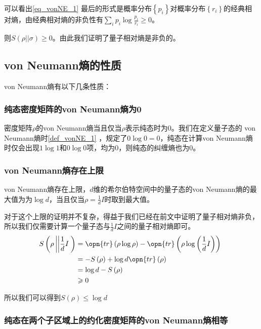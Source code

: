 可以看出\autoref{eq_vonNE_1} 最后的形式是概率分布$\left\{p_i\right\}$对概率分布$\left\{r_i\right\}$的经典相对熵，由经典相对熵的非负性有$\sum\limits_i p_i \log\frac{p_i}{r_i}\geqslant 0$。

则$S\left(\rho || \sigma\right)\geqslant 0$。由此我们证明了量子相对熵是非负的。

\subsection{von Neumann熵的性质}

von Neumann熵有以下几条性质：

\subsubsection{纯态密度矩阵的von Neumann熵为0}
密度矩阵$\rho$的von Neumann熵当且仅当$\rho$表示纯态时为0。我们在定义量子态的 von Neumann熵时\autoref{def_vonNE_1} ，规定了$0\log 0 = 0$，纯态在计算von Neumann熵时仅会出现$1\log 1$和$0\log 0$项，均为0，则纯态的纠缠熵也为0。

\subsubsection{von Neumann熵存在上限}

von Neumann熵存在上限，$d$维的希尔伯特空间中的量子态的von Neumann熵的最大值为为$\log d$，当且仅当$\rho = \frac{1}{d}I$时取到最大值。

对于这个上限的证明并不复杂，得益于我们已经在前文中证明了量子相对熵非负，所以我们仅需要计算一个量子态与$\frac{1}{d}I$之间的量子相对熵即可。
\begin{equation}
\begin{aligned}
S\left(\rho \left|\left| \frac{1}{d}I\right.\right.\right) &= \opn{tr}\left(\rho\log\rho\right) - \opn{tr}\left( \rho\log\left(\frac{1}{d}I\right) \right) \\
&= -S\left(\rho\right) + \log d \opn{tr}\left(\rho\right) \\
&= \log d - S\left(\rho\right)  \\
&\geqslant 0
\end{aligned}~
\end{equation}

所以我们可以得到$S\left(\rho\right) \leqslant \log d$

\subsubsection{纯态在两个子区域上的约化密度矩阵的von Neumann熵相等}

